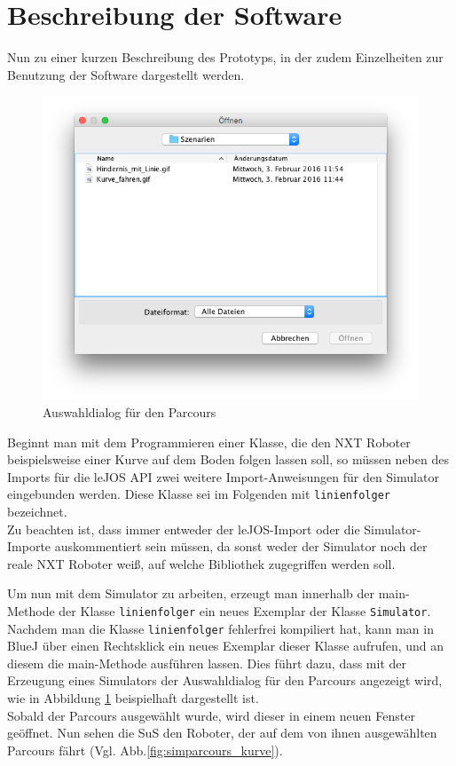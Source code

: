\documentclass[paper=a4, DIV=14, BCOR=15mm, twoside=on, onecolumn=on, open = right, titlepage =on, parskip =half, headsepline = on, footsepline = on, chapterprefix = on, appendixprefix = off, fontsize = 12pt, numbers = noenddot, abstract = on]{scrbook}
\begin{document}
\par \singlespacing
\section{Beschreibung der Software}
\onehalfspacing

Nun zu einer kurzen Beschreibung des Prototyps, in der zudem Einzelheiten zur Benutzung der Software dargestellt werden.



\begin{figure}[H]
\centering
\includegraphics[scale=0.45]{images/dialog_szenarien.png} 
\caption{Auswahldialog für den Parcours}
\label{fig:auswahldialog}
\end{figure}
Beginnt man mit dem Programmieren einer Klasse, die den NXT Roboter beispielsweise einer Kurve auf dem Boden folgen lassen soll, so müssen neben des Imports für die leJOS API zwei weitere Import-Anweisungen für den Simulator eingebunden werden. Diese Klasse sei im Folgenden mit \texttt{linienfolger} bezeichnet.\\
Zu beachten ist, dass immer entweder der leJOS-Import oder die Simulator-Importe auskommentiert sein müssen, da sonst weder der Simulator noch der reale NXT Roboter weiß, auf welche Bibliothek zugegriffen werden soll.

Um nun mit dem Simulator zu arbeiten, erzeugt man innerhalb der main-Methode der Klasse \texttt{linienfolger} ein neues Exemplar der Klasse \texttt{Simulator}. Nachdem man die Klasse \texttt{linienfolger} fehlerfrei kompiliert hat, kann man in BlueJ über einen Rechtsklick ein neues Exemplar dieser Klasse aufrufen, und an diesem die main-Me\-tho\-de ausführen lassen. Dies führt dazu, dass mit der Erzeugung eines Simulators der Auswahldialog für den Parcours angezeigt wird, wie in Abbildung \ref{fig:auswahldialog} beispielhaft dargestellt ist.\\
Sobald der Parcours ausgewählt wurde, wird dieser in einem neuen Fenster geöffnet. Nun sehen die SuS den Roboter, der auf dem von ihnen ausgewählten Parcours fährt (Vgl. Abb.\ref{fig:simparcours_kurve}).
\end{document}
